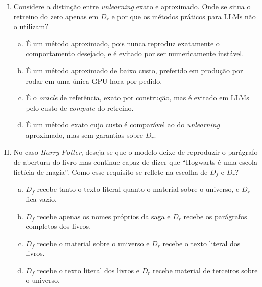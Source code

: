 \documentclass{dlproblemset}
\begin{document}
\begin{enumerate}[I)]
    \item Considere a distinção entre \textit{unlearning} exato e aproximado. Onde se situa o retreino do zero apenas em $D_r$ e por que os métodos práticos para LLMs não o utilizam?
    \begin{enumerate}[(a)]
        \item É um método aproximado, pois nunca reproduz exatamente o comportamento desejado, e é evitado por ser numericamente instável.
        \item É um método aproximado de baixo custo, preferido em produção por rodar em uma única GPU-hora por pedido.
        \item É o \textit{oracle} de referência, exato por construção, mas é evitado em LLMs pelo custo de \textit{compute} do retreino.
        \item É um método exato cujo custo é comparável ao do \textit{unlearning} aproximado, mas sem garantias sobre $D_r$.
    \end{enumerate}

    \item No caso \textit{Harry Potter}, deseja-se que o modelo deixe de reproduzir o parágrafo de abertura do livro mas continue capaz de dizer que ``Hogwarts é uma escola fictícia de magia''. Como esse requisito se reflete na escolha de $D_f$ e $D_r$?
    \begin{enumerate}[(a)]
        \item $D_f$ recebe tanto o texto literal quanto o material sobre o universo, e $D_r$ fica vazio.
        \item $D_f$ recebe apenas os nomes próprios da saga e $D_r$ recebe os parágrafos completos dos livros.
        \item $D_f$ recebe o material sobre o universo e $D_r$ recebe o texto literal dos livros.
        \item $D_f$ recebe o texto literal dos livros e $D_r$ recebe material de terceiros sobre o universo.
    \end{enumerate}


\end{enumerate}
\end{document}
